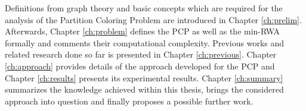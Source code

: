 Definitions from graph theory and basic concepts which are required for the analysis of the Partition Coloring Problem are introduced in Chapter \ref{ch:prelim}. Afterwards, Chapter \ref{ch:problem} defines the PCP as well as the min-RWA formally and comments their computational complexity. Previous works and related research done so far is presented in Chapter \ref{ch:previous}. Chapter \ref{ch:approach} provides details of the approach developed for the PCP and Chapter \ref{ch:results} presents its experimental results. Chapter \ref{ch:summary} summarizes the knowledge achieved within this thesis, brings the considered approach into question and finally proposes a possible further work.